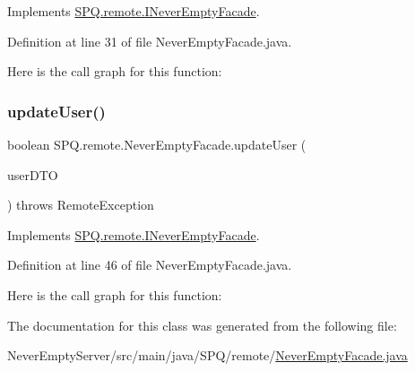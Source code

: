 Implements \mbox{\hyperlink{interface_s_p_q_1_1remote_1_1_i_never_empty_facade_a7867e1e698fea32a535a1daeda4e8d6a}{S\+P\+Q.\+remote.\+I\+Never\+Empty\+Facade}}.



Definition at line 31 of file Never\+Empty\+Facade.\+java.

Here is the call graph for this function\+:
\mbox{\label{class_s_p_q_1_1remote_1_1_never_empty_facade_a55ad685d3c176424a7f5f18e5ebe043b}} 
\subsubsection{\texorpdfstring{update\+User()}{updateUser()}}
{\footnotesize\ttfamily boolean S\+P\+Q.\+remote.\+Never\+Empty\+Facade.\+update\+User (\begin{DoxyParamCaption}\item[{\mbox{\hyperlink{class_s_p_q_1_1dto_1_1_user_d_t_o}{User\+D\+TO}}}]{user\+D\+TO }\end{DoxyParamCaption}) throws Remote\+Exception}



Implements \mbox{\hyperlink{interface_s_p_q_1_1remote_1_1_i_never_empty_facade_add6dafb25f59c549e924c76c6e8f31c6}{S\+P\+Q.\+remote.\+I\+Never\+Empty\+Facade}}.



Definition at line 46 of file Never\+Empty\+Facade.\+java.

Here is the call graph for this function\+:


The documentation for this class was generated from the following file\+:\begin{DoxyCompactItemize}
\item 
Never\+Empty\+Server/src/main/java/\+S\+P\+Q/remote/\mbox{\hyperlink{_never_empty_facade_8java}{Never\+Empty\+Facade.\+java}}\end{DoxyCompactItemize}
